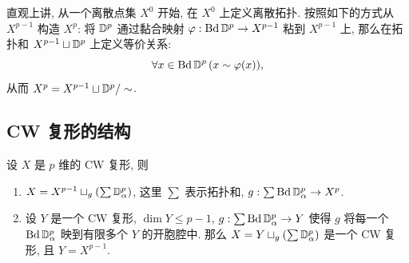 直观上讲, 从一个离散点集 $ X^0 $ 开始, 在 $ X^0 $ 上定义离散拓扑. 按照如下的方式从 $ X^{p-1} $ 构造 $ X^p $: 将 $ \mathbb{D}^p $ 通过黏合映射 $ \varphi : \mathrm{Bd}\,\mathbb{D}^p\to X^{p-1} $ 粘到 $ X^{p-1} $ 上, 那么在拓扑和 $ X^{p-1}\sqcup\mathbb{D}^p $ 上定义等价关系:
\[
	\forall x\in\mathrm{Bd}\,\mathbb{D}^p\,(x\sim\varphi(x)),
\]
从而 $ X^p=X^{p-1}\sqcup\mathbb{D}^p/\sim $.

\subsection{CW 复形的结构}

\begin{Theorem}
	设 $ X $ 是 $ p $ 维的 CW 复形, 则
	\begin{enumerate}
		\item $ X=X^{p-1}\sqcup_g(\sum\mathbb{D}_\alpha^p) $, 这里 $ \sum $ 表示拓扑和, $ g : \sum\mathrm{Bd}\,\mathbb{D}_\alpha^p\to X^p $.
		\item 设 $ Y $ 是一个 CW 复形, $ \dim Y\leqslant p-1 $, $ g : \sum\mathrm{Bd}\,\mathbb{D}_\alpha^p\to Y $ 使得 $ g $ 将每一个 $ \mathrm{Bd}\,\mathbb{D}_\alpha^p $ 映到有限多个 $ Y $ 的开胞腔中. 那么 $ X=Y\sqcup_g(\sum\mathbb{D}_\alpha^p) $ 是一个 CW 复形, 且 $ Y=X^{p-1} $.
	\end{enumerate}
\end{Theorem}
